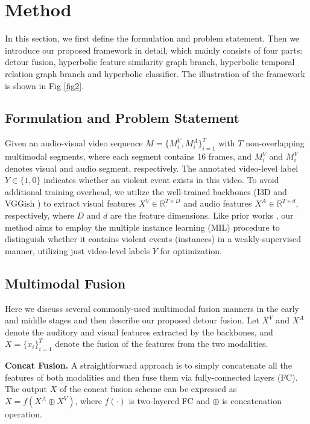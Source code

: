 \documentclass[sigconf]{acmart}
\begin{document}
\section{Method}
In this section, we first define the formulation and problem statement. Then we introduce our proposed framework in detail, which mainly consists of four parts: detour fusion, hyperbolic feature similarity graph branch, hyperbolic temporal relation graph branch and hyperbolic classifier. The illustration of the framework is shown in Fig \ref{fig2}.
 
 \subsection{Formulation and Problem Statement}
Given an audio-visual video sequence $M=\{M^V_i, M^A_i\}_{i=1}^T$ with $T$ non-overlapping multimodal segments, where each segment contains 16 frames, and $M^V_i$ and $M^V_i$ denotes visual and audio segment, respectively. The annotated video-level label $Y \in \{1, 0\}$ indicates whether an violent event exists in this video. To avoid additional training overhead, we utilize the well-trained backbones (I3D\cite{c:12} and VGGish \cite{Gemmeke_Ellis, Hershey_Chaudhuri}) to extract visual features $X^V \in{\mathbb{R}^{T\times D}}$ and audio features $X^A \in{\mathbb{R}^{T\times d}}$, respectively, where $D$ and $d$ are the feature dimensions. Like prior works \cite{c:2, c:4, c:7, c:9}, our method aims to employ the multiple instance learning (MIL) procedure to distinguish whether it contains violent events (instances) in a weakly-supervised manner, utilizing just video-level labels $Y$ for optimization.

\subsection{Multimodal Fusion}
Here we discuss several commonly-used multimodal fusion manners in the early and middle stages and then describe our proposed detour fusion. Let $X^V$ and $X^A$ denote the auditory and visual features extracted by the backbones, and $X = \{x_i\}_{i=1}^T$ denote the fusion of the features from the two modalities.

\noindent\textbf{Concat Fusion.}
A straightforward approach is to simply concatenate all the features of both modalities and then fuse them via fully-connected layers (FC). The output $X$ of the concat fusion scheme can be expressed as $X = f(X^A \oplus X^V)$, where $f(\cdot)$ is two-layered FC and $\oplus$ is concatenation operation.
\end{document}
